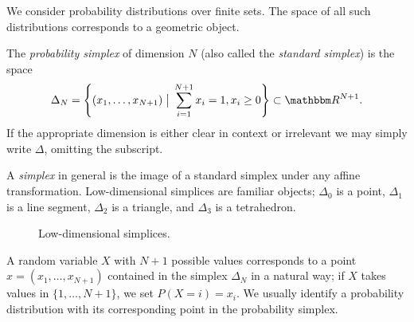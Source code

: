 \documentclass[11pt,titlepage]{article}
\newcommand*{\vbar}{\;\big\vert\;}
\numberwithin{equation}{section}
\begin{document}
    We consider probability distributions over finite sets.  The space of all
    such distributions corresponds to a geometric object.
    
    \begin{definition} The \emph{probability simplex} of dimension $N$ (also
    called the \emph{standard simplex}) is the space
    \[
        \Delta_N = 
        \left\{(x_1, \ldots, x_{N+1}) \vbar \sum_{i=1}^{N+1} x_i= 1, x_i \ge 0 \right\} 
        \subset
        \R^{N+1}.
    \]
    If the appropriate dimension is either clear in context or irrelevant we
    may simply write $\Delta$, omitting the subscript.
    \end{definition}
    A \emph{simplex} in general is the image of a standard simplex under any
    affine transformation.  Low-dimensional simplices are familiar objects;
    $\Delta_0$ is a point, $\Delta_1$ is a line segment, $\Delta_2$ is a
    triangle, and $\Delta_3$ is a tetrahedron.
    \begin{figure}[H]
        \centering
        \caption{Low-dimensional simplices.}
    \end{figure}
    \noindent A random variable $X$ with $N+1$ possible values corresponds to a point $x =
    (x_1, \ldots, x_{N+1})$ contained in the simplex $\Delta_N$ in a natural
    way; if $X$ takes values in $\{1, \ldots, N+1\}$, we set $P(X = i) = x_i$.
    We usually identify a probability distribution with its corresponding
    point in the probability simplex.  
    
\end{document}
